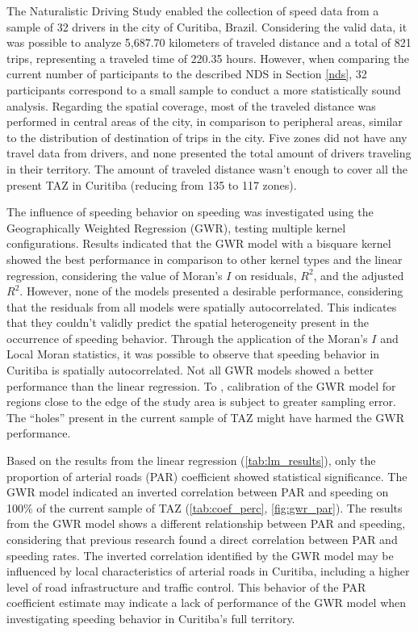 The Naturalistic Driving Study enabled the collection of speed data from a sample of 32 drivers in the city of Curitiba, Brazil. Considering the valid data, it was possible to analyze 5,687.70 kilometers of traveled distance and a total of 821 trips, representing a traveled time of 220.35 hours. However, when comparing the current number of participants to the described NDS in Section \ref{nds}, 32 participants correspond to a small sample to conduct a more statistically sound analysis. Regarding the spatial coverage, most of the traveled distance was performed in central areas of the city, in comparison to peripheral areas, similar to the distribution of destination of trips in the city. Five zones did not have any travel data from drivers, and none presented the total amount of drivers traveling in their territory. The amount of traveled distance wasn't enough to cover all the present TAZ in Curitiba (reducing from 135 to 117 zones). 

The influence of speeding behavior on speeding was investigated using the Geographically Weighted Regression (GWR), testing multiple kernel configurations. Results indicated that the GWR model with a bisquare kernel showed the best performance in comparison to other kernel types and the linear regression, considering the value of Moran's $I$ on residuals, $R^2$, and the adjusted $R^2$. However, none of the models presented a desirable performance, considering that the residuals from all models were spatially autocorrelated. This indicates that they couldn't validly predict the spatial heterogeneity present in the occurrence of speeding behavior. Through the application of the Moran's $I$ and Local Moran statistics, it was possible to observe that speeding behavior in Curitiba is spatially autocorrelated. Not all GWR models showed a better performance than the linear regression. To \textcite{Brunsdon2010}, calibration of the GWR model for regions close to the edge of the study area is subject to greater sampling error. The ``holes'' present in the current sample of TAZ might have harmed the GWR performance. 

Based on the results from the linear regression (\autoref{tab:lm_results}), only the proportion of arterial roads (PAR) coefficient showed statistical significance. The GWR model indicated an inverted correlation between PAR and speeding on 100\% of the current sample of TAZ (\autoref{tab:coef_perc}, \autoref{fig:gwr_par}). The results from the GWR model shows a different relationship between PAR and speeding, considering that previous research found a direct correlation between PAR and speeding rates. The inverted correlation identified by the GWR model may be influenced by local characteristics of arterial roads in Curitiba, including a higher level of road infrastructure and traffic control. This behavior of the PAR coefficient estimate may indicate a lack of performance of the GWR model when investigating speeding behavior in Curitiba's full territory.

